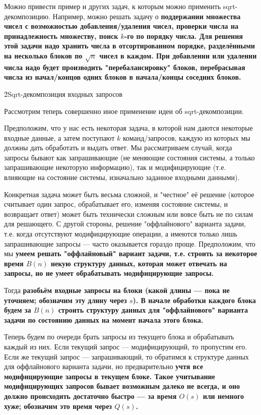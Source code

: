 Можно привести пример и других задач, к которым можно применить sqrt-декомпозицию. Например, можно решать задачу о \bf{поддержании множества чисел} с возможностью добавления/удаления чисел, проверки числа на принадлежность множеству, поиск $k$-го по порядку числа. Для решения этой задачи надо хранить числа в отсортированном порядке, разделёнными на несколько блоков по $\sqrt{n}$ чисел в каждом. При добавлении или удалении числа надо будет производить "перебалансировку" блоков, перебрасывая числа из начал/концов одних блоков в начала/концы соседних блоков.


\h2{Sqrt-декомпозиция входных запросов}

Рассмотрим теперь совершенно иное применение идеи об sqrt-декомпозиции.

Предположим, что у нас есть некоторая задача, в которой нам даются некоторые входные данные, а затем поступают $k$ команд/запросов, каждую из которых мы должны дать обработать и выдать ответ. Мы рассматриваем случай, когда запросы бывают как запрашивающие (не меняющие состояния системы, а только запрашивающие некоторую информацию), так и модифицирующие (т.е. влияющие на состояние системы, изначально заданное входными данными).

Конкретная задача может быть весьма сложной, и "честное" её решение (которое считывает один запрос, обрабатывает его, изменяя состояние системы, и возвращает ответ) может быть технически сложным или вовсе быть не по силам для решающего. С другой стороны, решение "оффлайнового" варианта задачи, т.е. когда отсутствуют модифицирующие операции, а имеются только лишь запрашивающие запросы --- часто оказывается гораздо проще. Предположим, что мы \bf{умеем решать "оффлайновый" вариант} задачи, т.е. строить за некоторое время $B(n)$ некую структуру данных, которая может отвечать на запросы, но не умеет обрабатывать модифицирующие запросы.

Тогда \bf{разобьём входные запросы на блоки} (какой длины --- пока не уточняем; обозначим эту длину через $s$). В начале обработки каждого блока будем за $B(n)$ строить структуру данных для "оффлайнового" варианта задачи по состоянию данных на момент начала этого блока.

Теперь будем по очереди брать запросы из текущего блока и обрабатывать каждый из них. Если текущий запрос --- модифицирующий, то пропустим его. Если же текущий запрос --- запрашивающий, то обратимся к структуре данных для оффлайнового варианта задачи, но предварительно \bf{учтя все модифицирующие запросы в текущем блоке}. Такое учитывание модифицирующих запросов бывает возможным далеко не всегда, и оно должно происходить достаточно быстро --- за время $O(s)$ или немного хуже; обозначим это время через $Q(s)$.

